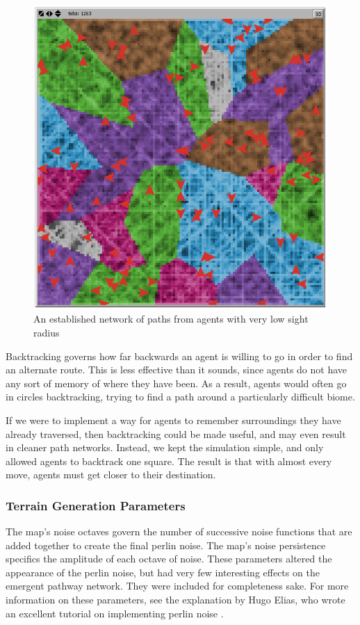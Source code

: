 \documentclass[conference]{IEEEtran}
\begin{document}
\begin{figure}[h]
\begin{center}
\includegraphics[scale=0.4]{image/results6}
\end{center}
\caption{An established network of paths from agents with very low sight radius}
\end{figure}

Backtracking governs how far backwards an agent is willing to go in order to find an alternate route. This is less effective than it sounds, since agents do not have any sort of memory of where they have been. As a result, agents would often go in circles backtracking, trying to find a path around a particularly difficult biome.

If we were to implement a way for agents to remember surroundings they have already traversed, then backtracking could be made useful, and may even result in cleaner path networks. Instead, we kept the simulation simple, and only allowed agents to backtrack one square. The result is that with almost every move, agents must get closer to their destination.

\subsubsection{Terrain Generation Parameters}
The map's noise octaves govern the number of successive noise functions that are added together to create the final perlin noise. The map's noise persistence specifics the amplitude of each octave of noise. These parameters altered the appearance of the perlin noise, but had very few interesting effects on the emergent pathway network. They were included for completeness sake. For more information on these parameters, see the explanation by Hugo Elias, who wrote an excellent tutorial on implementing perlin noise \cite{elias:perlin}.
\end{document}
